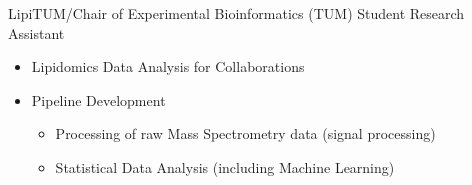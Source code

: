 {%
	LipiTUM/Chair of Experimental Bioinformatics (TUM)
}
{%
	Student Research Assistant
}
{%
	\vspace*{.07cm}
	\begin{itemize}
		\item Lipidomics Data Analysis for Collaborations
		\item Pipeline Development
		\begin{itemize}
			\item Processing of raw Mass Spectrometry data (signal processing)
			\item Statistical Data Analysis (including Machine Learning)
		\end{itemize}
	\end{itemize}
}

